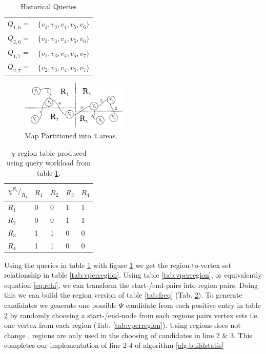 \begin{table}
\center
\begin{tabular}{l l}
$Q_{1,6} =$ 	& $\{v_1,v_3,v_4,v_5,v_6\}$\\
$Q_{2,6} =$ 	& $\{v_2,v_3,v_4,v_5,v_6\}$ \\
$Q_{1,7} =$ 	& $\{v_1,v_3,v_4,v_5,v_7\}$ \\
$Q_{2,7} =$ 	& $\{v_2,v_3,v_4,v_5,v_7\}$ \\
\end{tabular}
\caption{Historical Queries}
\label{tab:queries2}
\end{table}


\begin{figure}[bht]
  \center
        \includegraphics[width=0.45\textwidth]{figures/mappartition}
        \caption{Map Partitioned into 4 areas.}
  \label{fig:mappartition}
\end{figure}

\begin{table}[!Htb]
\center
\begin{tabular}{|l||l|l|l|l|}
\textbf{$\chi {^{R_i}/_{R_j}}$}	& $R_1$		& $R_2$		& $R_3$		& $R_4$\\\hline
$R_1$			& 0		& 0		& 1		& 1 \\
$R_2$			& 0		& 0		& 1	 	& 1 \\
$R_3$			& 1		& 1		& 0	 	& 0 \\
$R_4$			& 1		& 1		& 0	 	& 0 \\
\end{tabular}
\caption{$\chi$ region table produced using query workload from table \ref{tab:queries2}.}
\label{tab:rchitable}
\end{table}


Using the queries in table \ref{tab:queries2} with figure \ref{fig:mappartition} we get the region-to-vertex set relationship in table \ref{tab:vperregion}. Using table \ref{tab:vperregion}, or equivalently equation \ref{eq:rchi}, we can transform the start-/end-pairs into region pairs. Doing this we can build the region version of table \ref{tab:freq} (Tab. \ref{tab:rchitable}). To generate candidates we generate one possible $\Psi$ candidate from each positive entry in table \ref{tab:rchitable} by randomly choosing a start-/end-node from each regions pairs vertex sets i.e. one vertex from each region (Tab. \ref{tab:vperregion}).
Using regions does not change \salgons, regions are only used in the choosing of candidates in line 2 \& 3.
This completes our implementation of line 2-4 of algorithm \ref{alg:buildstatis}

